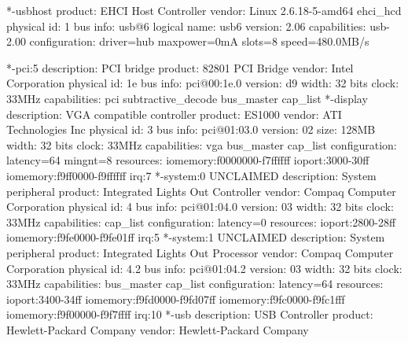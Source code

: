 \documentclass[mingoth,a4paper]{jsarticle}
\begin{document}
{{{{{{\begin{commandline}
           *-usbhost
                product: EHCI Host Controller
                vendor: Linux 2.6.18-5-amd64 ehci_hcd
                physical id: 1
                bus info: usb@6
                logical name: usb6
                version: 2.06
                capabilities: usb-2.00
                configuration: driver=hub maxpower=0mA slots=8 speed=480.0MB/s
\end{commandline}
\begin{commandline}
        *-pci:5
             description: PCI bridge
             product: 82801 PCI Bridge
             vendor: Intel Corporation
             physical id: 1e
             bus info: pci@00:1e.0
             version: d9
             width: 32 bits
             clock: 33MHz
             capabilities: pci subtractive_decode bus_master cap_list
           *-display
                description: VGA compatible controller
                product: ES1000
                vendor: ATI Technologies Inc
                physical id: 3
                bus info: pci@01:03.0
                version: 02
                size: 128MB
                width: 32 bits
                clock: 33MHz
                capabilities: vga bus_master cap_list
                configuration: latency=64 mingnt=8
                resources: iomemory:f0000000-f7ffffff ioport:3000-30ff iomemory:f9ff0000-f9ffffff irq:7
           *-system:0 UNCLAIMED
                description: System peripheral
                product: Integrated Lights Out Controller
                vendor: Compaq Computer Corporation
                physical id: 4
                bus info: pci@01:04.0
                version: 03
                width: 32 bits
                clock: 33MHz
                capabilities: cap_list
                configuration: latency=0
                resources: ioport:2800-28ff iomemory:f9fe0000-f9fe01ff irq:5
           *-system:1 UNCLAIMED
                description: System peripheral
                product: Integrated Lights Out  Processor
                vendor: Compaq Computer Corporation
                physical id: 4.2
                bus info: pci@01:04.2
                version: 03
                width: 32 bits
                clock: 33MHz
                capabilities: bus_master cap_list
                configuration: latency=64
                resources: ioport:3400-34ff iomemory:f9fd0000-f9fd07ff iomemory:f9fc0000-f9fc1fff iomemory:f9f00000-f9f7ffff irq:10
           *-usb
                description: USB Controller
                product: Hewlett-Packard Company
                vendor: Hewlett-Packard Company

\end{commandline}}}}}}}
\end{document}
